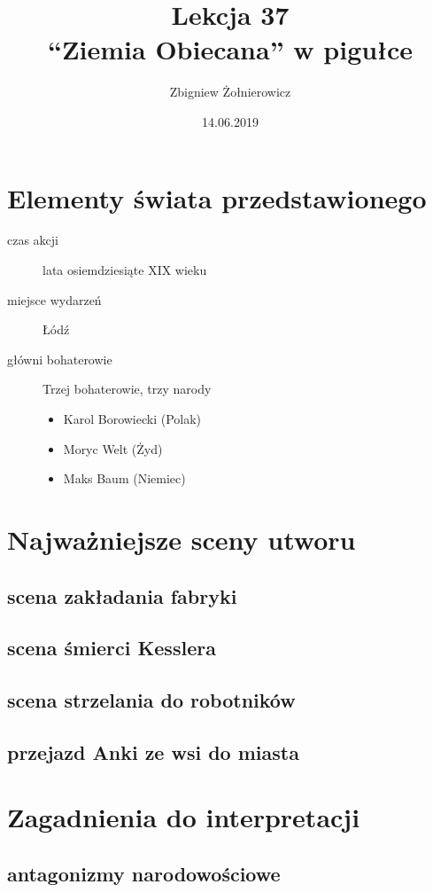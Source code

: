 \documentclass{article}
\begin{document}
\title{
        {\huge Lekcja 37} \\
        {\large ``Ziemia Obiecana'' w pigułce}
}
\author{Zbigniew Żołnierowicz}
\date{14.06.2019}
\maketitle
\section{Elementy świata przedstawionego}
\begin{description}
    \item[czas akcji] lata osiemdziesiąte XIX wieku
    \item[miejsce wydarzeń] Łódź
    \item[główni bohaterowie] Trzej bohaterowie, trzy narody
    \begin{itemize}
        \item Karol Borowiecki (Polak)
        \item Moryc Welt (Żyd)
        \item Maks Baum (Niemiec)
    \end{itemize}
\end{description}
\section{Najważniejsze sceny utworu}
\subsection{scena zakładania fabryki}
\subsection{scena śmierci Kesslera}
\subsection{scena strzelania do robotników}
\subsection{przejazd Anki ze wsi do miasta}
\section{Zagadnienia do interpretacji}
\subsection{antagonizmy narodowościowe}
\end{document}
